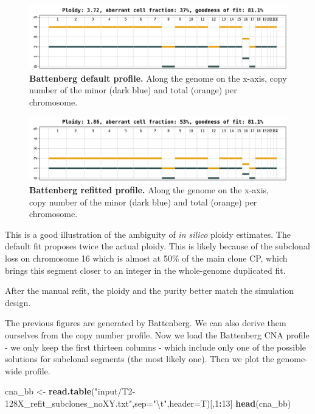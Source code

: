 \documentclass[]{article}
\newenvironment{Shaded}{\begin{snugshade}}{\end{snugshade}}
\newcommand{\CharTok}[1]{\textcolor[rgb]{0.31,0.60,0.02}{#1}}
\newcommand{\DataTypeTok}[1]{\textcolor[rgb]{0.13,0.29,0.53}{#1}}
\newcommand{\DecValTok}[1]{\textcolor[rgb]{0.00,0.00,0.81}{#1}}
\newcommand{\KeywordTok}[1]{\textcolor[rgb]{0.13,0.29,0.53}{\textbf{#1}}}
\newcommand{\NormalTok}[1]{#1}
\newcommand{\OperatorTok}[1]{\textcolor[rgb]{0.81,0.36,0.00}{\textbf{#1}}}
\newcommand{\StringTok}[1]{\textcolor[rgb]{0.31,0.60,0.02}{#1}}
\begin{document}
\begin{figure}[H]
  \centering
  \includegraphics{figures/T2-128X_BattenbergProfile_average.png}
  \caption{\textbf{Battenberg default profile.} Along the genome on the x-axis,
  copy number of the minor (dark blue) and total (orange) per chromosome.}
  \label{Figure4}
\end{figure}

\begin{figure}[H]
  \centering
  \includegraphics{figures/T2-128X_BattenbergProfile.refit_average.png}
  \caption{\textbf{Battenberg refitted profile.} Along the genome on the x-axis,
  copy number of the minor (dark blue) and total (orange) per chromosome.}
  \label{Figure5}
\end{figure}

This is a good illustration of the ambiguity of \emph{in silico} ploidy
estimates. The default fit proposes twice the actual ploidy. This is
likely because of the subclonal loss on chromosome 16 which is almost at
50\% of the main clone CP, which brings this segment closer to an
integer in the whole-genome duplicated fit.

After the manual refit, the ploidy and the purity better match the
simulation design.

The previous figures are generated by Battenberg. We can also derive
them ourselves from the copy number profile. Now we load the Battenberg
CNA profile - we only keep the first thirteen columns - which include
only one of the possible solutions for subclonal segments (the most
likely one). Then we plot the genome-wide profile.

\begin{Shaded}
\begin{Highlighting}[]
\NormalTok{cna_bb <-}\StringTok{ }\KeywordTok{read.table}\NormalTok{(}\StringTok{"input/T2-128X_refit_subclones_noXY.txt"}\NormalTok{,}\DataTypeTok{sep=}\StringTok{"}\CharTok{\textbackslash{}t}\StringTok{"}\NormalTok{,}\DataTypeTok{header=}\NormalTok{T)[,}\DecValTok{1}\OperatorTok{:}\DecValTok{13}\NormalTok{]}
\KeywordTok{head}\NormalTok{(cna_bb)}
\end{Highlighting}
\end{Shaded}
\end{document}

